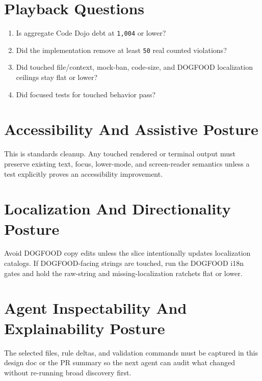 \section{Playback Questions}\label{record-235-playback-questions}

\begin{enumerate}
\def\labelenumi{\arabic{enumi}.}
\tightlist
\item
  Is aggregate Code Dojo debt at \texttt{1\allowbreak{},\allowbreak{}0\allowbreak{}0\allowbreak{}4} or lower?
\item
  Did the implementation remove at least \texttt{5\allowbreak{}0} real counted violations?
\item
  Did touched file/context, mock-ban, code-size, and DOGFOOD localization ceilings stay flat or lower?
\item
  Did focused tests for touched behavior pass?
\end{enumerate}

\section{Accessibility And Assistive Posture}\label{record-235-accessibility-and-assistive-posture}

This is standards cleanup. Any touched rendered or terminal output must preserve existing text, focus, lower-mode, and screen-reader semantics unless a test explicitly proves an accessibility improvement.

\section{Localization And Directionality Posture}\label{record-235-localization-and-directionality-posture}

Avoid DOGFOOD copy edits unless the slice intentionally updates localization catalogs. If DOGFOOD-facing strings are touched, run the DOGFOOD i18n gates and hold the raw-string and missing-localization ratchets flat or lower.

\section{Agent Inspectability And Explainability Posture}\label{record-235-agent-inspectability-and-explainability-posture}

The selected files, rule deltas, and validation commands must be captured in this design doc or the PR summary so the next agent can audit what changed without re-running broad discovery first.

